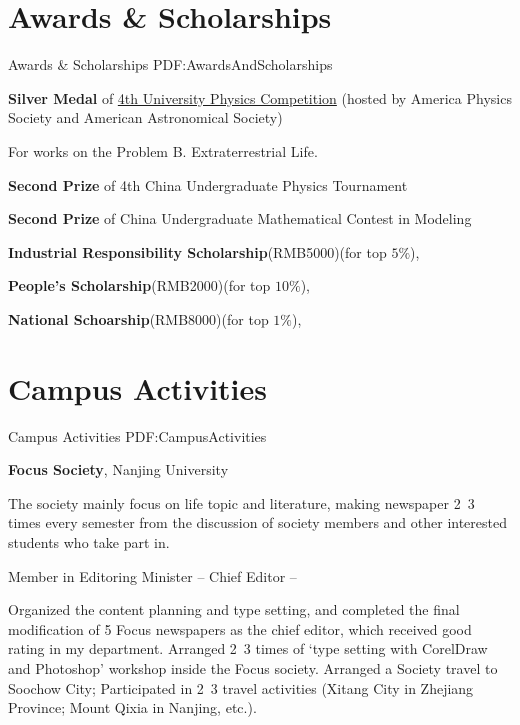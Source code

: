 \documentclass[letterpaper,MMMyyyy,nonstop]{simpleresumecv}
\begin{document}
\begin{body}

\section
{Awards \&\newline
Scholarships}
{Awards \& Scholarships}
{PDF:AwardsAndScholarships}

\BulletItem
\textbf{Silver Medal} of \href{http://www.uphysicsc.com/2013contest.html}{4th University Physics Competition}
(hosted by America Physics Society and American Astronomical Society)
\hfill
{}
\begin{detail}
\SubItem
For works on the Problem B. Extraterrestrial Life.
\end{detail}

\Gap
\BulletItem
\textbf{Second Prize} 
of 4th China Undergraduate Physics Tournament
\hfill
{}

\Gap
\BulletItem
\textbf{Second Prize}
of China Undergraduate Mathematical Contest in Modeling
\hfill
{}

\Gap
\BulletItem
\textbf{Industrial Responsibility Scholarship}(RMB5000)(for top $5\%$),
\hfill
{}

\Gap
\BulletItem
\textbf{People's Scholarship}(RMB2000)(for top $10\%$),
\hfill
{}

\Gap
\BulletItem
\textbf{National Schoarship}(RMB8000)(for top $1\%$),
\hfill
{}



\section
{Campus Activities}
{Campus Activities}
{PDF:CampusActivities}

\textbf{Focus Society},
Nanjing University

\GapNoBreak
\begin{detail}
\BulletItem
The society mainly focus on life topic and literature, making newspaper 2~3 times every semester from the discussion of society members and other interested students who take part in.
\end{detail}
\BulletItem
Member in Editoring Minister
\hfill
{} --
\BulletItem
Chief Editor
\hfill
{} --
\begin{detail}
\SubBulletItem
Organized the content planning and type setting, and completed the final modification of 5 Focus newspapers as the chief editor, which received good rating in my department.
\SubBulletItem
Arranged 2~3 times of `type setting with CorelDraw and Photoshop' workshop inside the Focus society.
\SubBulletItem
Arranged a Society travel to Soochow City; Participated in 2~3 travel activities (Xitang City in Zhejiang Province; Mount Qixia in Nanjing, etc.).
\end{detail}


\end{body}
\end{document}

